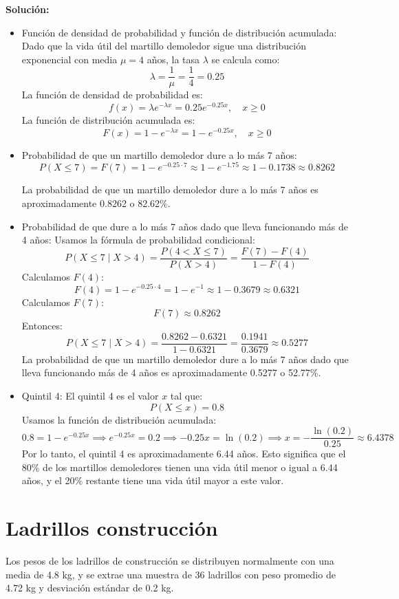 \documentclass{article}
\begin{document}
\textbf{Solución:}
\begin{itemize}
  \item Función de densidad de probabilidad y función de distribución acumulada:
  Dado que la vida útil del martillo demoledor sigue una distribución exponencial con media \( \mu = 4 \) años, la tasa \( \lambda \) se calcula como:
  \[
  \lambda = \frac{1}{\mu} = \frac{1}{4} = 0.25
  \]
  La función de densidad de probabilidad es:
  \[
  f(x) = \lambda e^{-\lambda x} = 0.25 e^{-0.25 x}, \quad x \geq 0
  \]
  La función de distribución acumulada es:
  \[
  F(x) = 1 - e^{-\lambda x} = 1 - e^{-0.25 x}, \quad x \geq 0
  \]

  \item Probabilidad de que un martillo demoledor dure a lo más 7 años:
  \[
  P(X \leq 7) = F(7) = 1 - e^{-0.25 \cdot 7} \approx 1 - e^{-1.75} \approx 1 - 0.1738 \approx 0.8262
  \]

  La probabilidad de que un martillo demoledor dure a lo más 7 años es aproximadamente 0.8262 o 82.62\%.

  \item Probabilidad de que dure a lo más 7 años dado que lleva funcionando más de 4 años:
  Usamos la fórmula de probabilidad condicional:
  \[
  P(X \leq 7 \mid X > 4) = \frac{P(4 < X \leq 7)}{P(X > 4)} = \frac{F(7) - F(4)}{1 - F(4)}
  \]
  Calculamos \( F(4) \):
  \[
  F(4) = 1 - e^{-0.25 \cdot 4} = 1 - e^{-1} \approx 1 - 0.3679 \approx 0.6321
  \] 
  Calculamos \( F(7) \):
  \[
  F(7) \approx 0.8262
  \]
  Entonces:
  \[
  P(X \leq 7 \mid X > 4) = \frac{0.8262 - 0.6321}{1 - 0.6321} = \frac{0.1941}{0.3679} \approx 0.5277
  \]
  La probabilidad de que un martillo demoledor dure a lo más 7 años dado que lleva funcionando más de 4 años es aproximadamente 0.5277 o 52.77\%.

  \item Quintil 4:
  El quintil 4 es el valor \( x \) tal que:
  \[
  P(X \leq x) = 0.8
  \]
  Usamos la función de distribución acumulada:
  \[
  0.8 = 1 - e^{-0.25 x} \implies e^{-0.25 x} = 0.2 \implies -0.25 x = \ln(0.2) \implies x = -\frac{\ln(0.2)}{0.25} \approx 6.4378
  \]
  Por lo tanto, el quintil 4 es aproximadamente 6.44 años. Esto significa que el 80\% de los martillos demoledores tienen una vida útil menor o igual a 6.44 años, y el 20\% restante tiene una vida útil mayor a este valor.
\end{itemize}

\section{Ladrillos construcción}
Los pesos de los ladrillos de construcción se distribuyen normalmente con una media de 4.8 kg, y se extrae una muestra de 36 ladrillos con peso promedio de 4.72 kg y desviación estándar de 0.2 kg.
\end{document}
